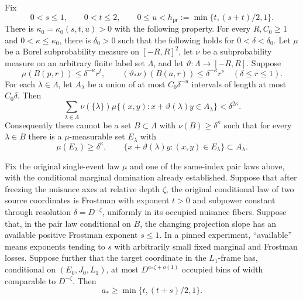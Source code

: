 \begin{lemma}\label{lem:robust-projection}
Fix
\[
 0<s\le1,\qquad 0<t\le2,\qquad
 0\le u<h_{\mathrm{pr}}:=\min\{t,(s+t)/2,1\}.
\]
There is $\kappa_0=\kappa_0(s,t,u)>0$ with the following property.
For every $R,C_0\ge1$ and $0<\kappa\le\kappa_0$, there is
$\delta_0>0$ such that the following holds for
$0<\delta<\delta_0$. Let $\mu$ be a Borel subprobability measure
on $[-R,R]^2$, let $\nu$ be a subprobability measure on an
arbitrary finite label set $\Lambda$, and let
$\vartheta:\Lambda\to[-R,R]$. Suppose
\begin{equation}\label{eq:robust-projection-frostman}
 \mu(B(p,r))\le\delta^{-\kappa}r^t,
 \qquad
 (\vartheta_*\nu)(B(a,r))\le\delta^{-\kappa}r^s
 \quad(\delta\le r\le1).
\end{equation}
For each $\lambda\in\Lambda$, let $A_\lambda$ be a union of at
most $C_0\delta^{-u}$ intervals of length at most $C_0\delta$.
Then
\begin{equation}\label{eq:robust-projection-product}
 \sum_{\lambda\in\Lambda}\nu(\{\lambda\})
 \mu\{(x,y):x+\vartheta(\lambda)y\in A_\lambda\}
 <\delta^{2\kappa}.
\end{equation}
Consequently there cannot be a set $B\subset\Lambda$ with
$\nu(B)\ge\delta^\kappa$ such that for every $\lambda\in B$
there is a $\mu$-measurable set $E_\lambda$ with
\begin{equation}\label{eq:robust-projection-subset}
 \mu(E_\lambda)\ge\delta^\kappa,
 \qquad
 \{x+\vartheta(\lambda)y:(x,y)\in E_\lambda\}
 \subset A_\lambda.
\end{equation}
\end{lemma}

\begin{lemma}
\label{lem:pr-projection-transfer}
Fix the original single-event law $\mu$ and one of the same-index
pair laws above, with the conditional marginal domination already
established. Suppose that after freezing
the nuisance axes at relative depth $\zeta$, the original
conditional law of two source coordinates is Frostman with
exponent $t>0$ and subpower constant through resolution
$\delta=D^{-\zeta}$, uniformly in its occupied nuisance fibers.
Suppose that, in the pair law conditional on $B$, the changing
projection slope has an available positive Frostman exponent $s\le1$.
In a pinned experiment, ``available'' means exponents tending to
$s$ with arbitrarily small fixed marginal and Frostman losses.
Suppose further that the target coordinate in the $L_1$-frame
has, conditional on $(E_0,J_0,L_1)$, at most
$D^{a_*\zeta+o(1)}$ occupied bins of width comparable to
$D^{-\zeta}$.
Then
\begin{equation}
 a_*\ge \min\{t,(t+s)/2,1\}.
\label{pr:projection-transfer}
\end{equation}
\end{lemma}

